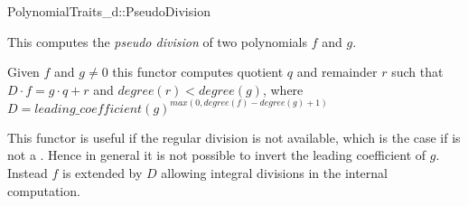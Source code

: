 \begin{ccRefConcept}{PolynomialTraits_d::PseudoDivision}

\ccDefinition

This  computes the {\em pseudo division} 
of two polynomials $f$ and $g$. 
     
Given $f$ and $g \neq 0$ this functor computes quotient $q$ and
remainder $r$ such that $D \cdot f = g \cdot q + r$ and $degree(r) < degree(g)$,
where $ D = leading\_coefficient(g)^{max(0, degree(f)-degree(g)+1)}$

This functor is useful if the regular division is not available, 
which is the case if  is not a . 
Hence in general it is not possible to invert the leading coefficient of $g$. 
Instead $f$ is extended by $D$ allowing integral divisions in the internal 
computation. 


\ccRefines 
{}

\ccTypes


\ccGlue

\ccOperations



\ccSeeAlso

\\
\\
\\
\\
\\

\end{ccRefConcept}
